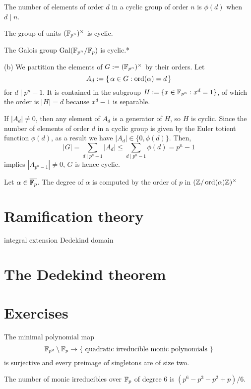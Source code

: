 \documentclass{../note}
\begin{document}
\begin{prb}
\begin{parts}
\item The number of elements of order $d$ in a cyclic group of order $n$ is $\phi(d)$ when $d\mid n$.
\item The group of units $(\mathbb{F}_{p^n})^\times$ is cyclic.
\item The Galois group $\operatorname{Gal}(\mathbb{F}_{p^n}/\mathbb{F}_p)$ is cyclic.*
\end{parts}
\end{prb}
\begin{pf}
(b)
We partition the elements of $G:=(\mathbb{F}_{p^n})^\times$ by their orders.
Let
\[A_d:=\{\,\alpha\in G:\operatorname{ord}(\alpha)=d\,\}\]
for $d\mid p^n-1$.
It is contained in the subgroup $H:=\{x\in\mathbb{F}_{p^n}:x^d=1\}$, of which the order is $|H|=d$ because $x^d-1$ is separable.

If $|A_d|\ne0$, then any element of $A_d$ is a generator of $H$, so $H$ is cyclic.
Since the number of elements of order $d$ in a cyclic group is given by the Euler totient function $\phi(d)$, as a result we have $|A_d|\in\{0,\phi(d)\}$.
Then,
\[|G|=\sum_{d\mid p^n-1}|A_d|\le\sum_{d\mid p^n-1}\phi(d)=p^n-1\]
implies $|A_{p^n-1}|\ne0$, $G$ is hence cyclic.
\end{pf}

\begin{prb}
Let $\alpha\in\overline{\mathbb{F}_p}$.
The degree of $\alpha$ is computed by the order of $p$ in $(\mathbb{Z}/\operatorname{ord}(\alpha)\mathbb{Z})^\times$
\end{prb}


\section{Ramification theory}
\begin{prb}
\end{prb}
integral extension
Dedekind domain


\section{The Dedekind theorem}






\section*{Exercises}
\begin{prb}
The minimal polynomial map
\[\mathbb{F}_{p^2}\setminus\mathbb{F}_p\to\{\text{ quadratic irreducible monic polynomials }\}\]
is surjective and every preimage of singletons are of size two.
\begin{parts}
\item The number of monic irreducibles over $\mathbb{F}_p$ of degree 6 is $(p^6-p^3-p^2+p)/6$.
\end{parts}
\end{prb}
\end{document}
